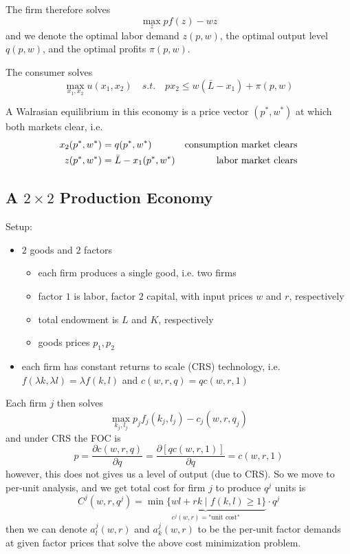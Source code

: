 The firm therefore solves
\[
\max_z p f(z) - wz
\]
and we denote the optimal labor demand $z(p, w)$, the optimal output
level $q(p,w)$, and the optimal profits $\pi(p,w)$. 

The consumer solves
\[
\max_{x_1, x_2} u(x_1, x_2) \quad s.t. \quad px_2 \leq w(\bar L - x_1) + \pi(p, w)
\]

A Walrasian equilibrium in this economy is a price vector $(p^*, w^*)$
at which both markets clear, i.e.
\begin{align}
x_2(p^*, w^*) &= q(p^*, w^*) & \text{consumption market clears} \notag \\
z(p^*, w^*) & = \bar L - x_1(p^*, w^*) & \text{labor market clears} \notag
\end{align}



\subsection{A $2 \times 2$ Production Economy}
\label{sec:2-times-2-prod}

Setup:

\begin{itemize}
\item $2$ goods and $2$ factors
  \begin{itemize}
  \item each firm produces a single good, i.e. two firms
  \item factor $1$ is labor, factor $2$ capital, with input prices $w$
    and $r$, respectively
  \item total endowment is $L$ and $K$, respectively
  \item goods prices $p_1, p_2$
  \end{itemize}
\item each firm has constant returns to scale (CRS) technology,
  i.e. $f(\lambda k, \lambda l) = \lambda f(k, l)$ and $c(w,r,q) = q
  c(w,r,1)$

\end{itemize}

Each firm $j$ then solves
\[
\max_{k_j, l_j} p_j f_j(k_j, l_j) - c_j(w, r, q_j)
\]
and under CRS the FOC is
\[
p = \frac{\partial c(w,r,q)}{\partial q} 
= \frac{\partial [qc(w,r,1)]}{\partial q} = c(w,r,1)
\]
however, this does not gives us a level of output (due to CRS). So we
move to per-unit analysis, and we get total cost for firm $j$ to
produce $q^j$ units is
\[
C^j(w, r, q^j) = 
\underbrace{\min\{wl + rk \; | \; f(k, l) \geq 1 \} }_{c^j(w,r) = \text{"unit cost"}}
\cdot q^j
\]
then we can denote $a^j_l(w,r)$ and $a^j_k(w,r)$ to be the per-unit
factor demands at given factor prices that solve the above cost
minimization problem.

